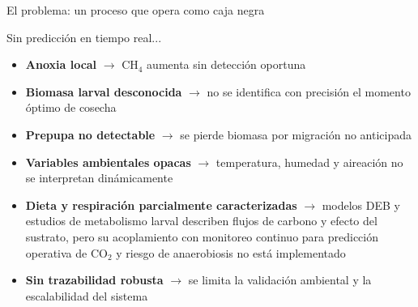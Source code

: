 \documentclass[aspectratio=169, 11pt]{beamer}
\begin{document}
\begin{frame}{El problema: un proceso que opera como caja negra}

\begin{alertblock}{Sin predicción en tiempo real...}
\footnotesize
\begin{itemize}
    \item \textbf{Anoxia local} $\rightarrow$ CH$_4$ aumenta sin detección oportuna
    \item \textbf{Biomasa larval desconocida} $\rightarrow$ no se identifica con precisión el momento óptimo de cosecha
    \item \textbf{Prepupa no detectable} $\rightarrow$ se pierde biomasa por migración no anticipada
    \item \textbf{Variables ambientales opacas} $\rightarrow$ temperatura, humedad y aireación no se interpretan dinámicamente
    \item \textbf{Dieta y respiración parcialmente caracterizadas} $\rightarrow$ modelos DEB \parencite{eriksenDynamicModellingFeed2022,padmanabhaComprehensiveDynamicGrowth2020} y estudios de metabolismo larval \parencite{bekkerImpactSubstrateMoisture2021a,rossiEstimatingDynamicsGreenhouse2024a} describen flujos de carbono y efecto del sustrato, pero su acoplamiento con monitoreo continuo para predicción operativa de CO$_2$ y riesgo de anaerobiosis no está implementado
    \item \textbf{Sin trazabilidad robusta} $\rightarrow$ se limita la validación ambiental y la escalabilidad del sistema
\end{itemize}
\end{alertblock}

\vspace{0.25cm}

\end{frame}

\end{document}
